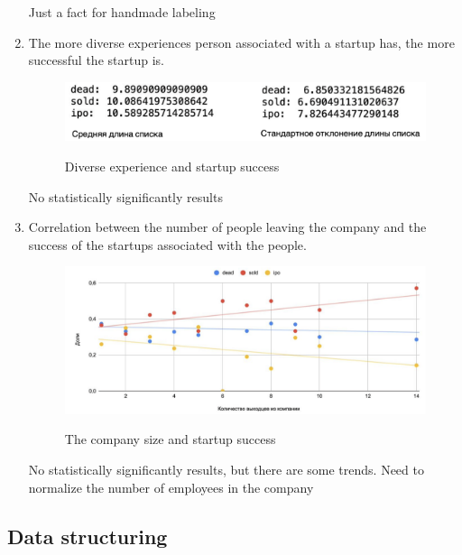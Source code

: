 \documentclass[12pt]{article}
\theoremstyle{plain}
\theoremstyle{definition}
\begin{document}
\begin{enumerate}
    Just a fact for handmade labeling
    
    \item The more diverse experiences person associated with a startup has, the more successful the startup is.
    
    \begin{figure}[H]
      \centering
      \includegraphics[width=120mm]{figures/collection/Different-experience-and-success.png}
      \label{fig:gd}
      \caption{Diverse experience and startup success}
    \end{figure}
    
    No statistically significantly results
    
    \item Correlation between the number of people leaving the company and the success of the startups associated with the people.
    
    \begin{figure}[H]
      \centering
      \includegraphics[width=120mm]{figures/collection/Count-of-exists-and-success.png}
      \label{fig:gd}
      \caption{The company size and startup success}
    \end{figure}
    
    No statistically significantly results, but there are some trends. Need to normalize the number of employees in the company
    
\end{enumerate}

\subsection{Data structuring}
\end{document}
